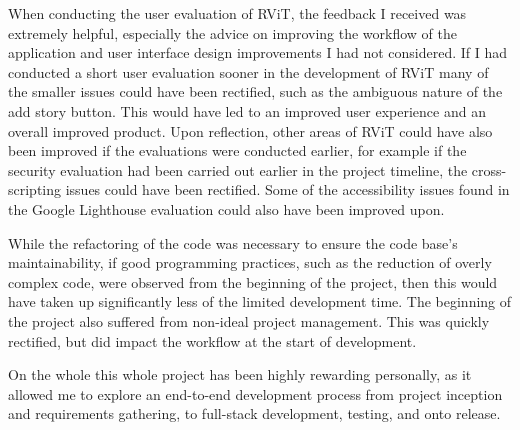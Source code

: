 \documentclass[l4proj.tex]{subfiles}
\begin{document}
When conducting the user evaluation of RViT, the feedback I received was extremely helpful, especially the advice on improving the workflow of the application and user interface design improvements I had not considered. If I had conducted a short user evaluation sooner in the development of RViT many of the smaller issues could have been rectified, such as the ambiguous nature of the add story button. This would have led to an improved user experience and an overall improved product. Upon reflection, other areas of RViT could have also been improved if the evaluations were conducted earlier, for example if the security evaluation had been carried out earlier in the project timeline, the cross-scripting issues could have been rectified. Some of the accessibility issues found in the Google Lighthouse evaluation could also have been improved upon.

While the refactoring of the code was necessary to ensure the code base's maintainability, if good programming practices, such as the reduction of overly complex code, were observed from the beginning of the project, then this would have taken up significantly less of the limited development time. The beginning of the project also suffered from non-ideal project management. This was quickly rectified, but did impact the workflow at the start of development.  

On the whole this whole project has been highly rewarding personally, as it allowed me to explore an end-to-end development process from project inception and requirements gathering, to full-stack development, testing, and onto release.
\end{document}
